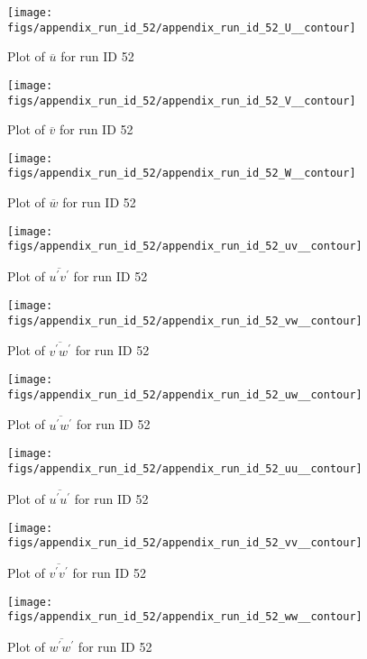 \begin{figure}[H]
\centering
\texttt{[image: figs/appendix\_run\_id\_52/appendix\_run\_id\_52\_U\_\_contour]}
\caption{Plot of $\overline{u}$ for run ID 52}
\label{fig:appendix_run_id_52_U__contour}
\end{figure}


\begin{figure}[H]
\centering
\texttt{[image: figs/appendix\_run\_id\_52/appendix\_run\_id\_52\_V\_\_contour]}
\caption{Plot of $\overline{v}$ for run ID 52}
\label{fig:appendix_run_id_52_V__contour}
\end{figure}


\begin{figure}[H]
\centering
\texttt{[image: figs/appendix\_run\_id\_52/appendix\_run\_id\_52\_W\_\_contour]}
\caption{Plot of $\overline{w}$ for run ID 52}
\label{fig:appendix_run_id_52_W__contour}
\end{figure}


\begin{figure}[H]
\centering
\texttt{[image: figs/appendix\_run\_id\_52/appendix\_run\_id\_52\_uv\_\_contour]}
\caption{Plot of $\overline{u^\prime v^\prime}$ for run ID 52}
\label{fig:appendix_run_id_52_uv__contour}
\end{figure}


\begin{figure}[H]
\centering
\texttt{[image: figs/appendix\_run\_id\_52/appendix\_run\_id\_52\_vw\_\_contour]}
\caption{Plot of $\overline{v^\prime w^\prime}$ for run ID 52}
\label{fig:appendix_run_id_52_vw__contour}
\end{figure}


\begin{figure}[H]
\centering
\texttt{[image: figs/appendix\_run\_id\_52/appendix\_run\_id\_52\_uw\_\_contour]}
\caption{Plot of $\overline{u^\prime w^\prime}$ for run ID 52}
\label{fig:appendix_run_id_52_uw__contour}
\end{figure}


\begin{figure}[H]
\centering
\texttt{[image: figs/appendix\_run\_id\_52/appendix\_run\_id\_52\_uu\_\_contour]}
\caption{Plot of $\overline{u^\prime u^\prime}$ for run ID 52}
\label{fig:appendix_run_id_52_uu__contour}
\end{figure}


\begin{figure}[H]
\centering
\texttt{[image: figs/appendix\_run\_id\_52/appendix\_run\_id\_52\_vv\_\_contour]}
\caption{Plot of $\overline{v^\prime v^\prime}$ for run ID 52}
\label{fig:appendix_run_id_52_vv__contour}
\end{figure}


\begin{figure}[H]
\centering
\texttt{[image: figs/appendix\_run\_id\_52/appendix\_run\_id\_52\_ww\_\_contour]}
\caption{Plot of $\overline{w^\prime w^\prime}$ for run ID 52}
\label{fig:appendix_run_id_52_ww__contour}
\end{figure}



